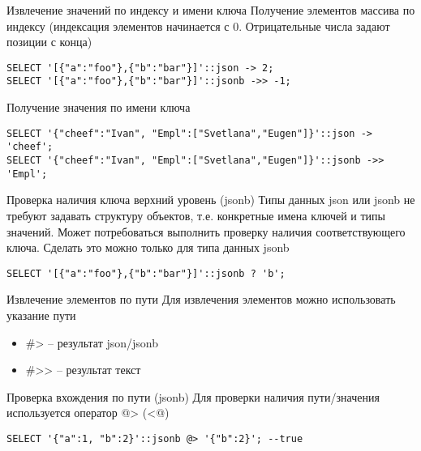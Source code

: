\documentclass[12pt]{article}
\begin{document}
\begin{Example}{Извлечение значений по индексу и имени ключа}
    Получение элементов массива по индексу (индексация элементов начинается с 0. Отрицательные числа задают позиции с конца)

\begin{lstlisting}
SELECT '[{"a":"foo"},{"b":"bar"}]'::json -> 2;
SELECT '[{"a":"foo"},{"b":"bar"}]'::jsonb ->> -1;
\end{lstlisting}

    Получение значения по имени ключа 

\begin{lstlisting}
SELECT '{"cheef":"Ivan", "Empl":["Svetlana","Eugen"]}'::json -> 'cheef';
SELECT '{"cheef":"Ivan", "Empl":["Svetlana","Eugen"]}'::jsonb ->> 'Empl';
\end{lstlisting}
\end{Example}

\begin{Example}{Проверка наличия ключа верхний уровень (jsonb)}
    Типы данных json или jsonb не требуют задавать структуру объектов, т.е. конкретные имена ключей и типы значений. Может потребоваться выполнить проверку наличия соответствующего ключа. Сделать это можно только для типа данных jsonb

\begin{lstlisting}
SELECT '[{"a":"foo"},{"b":"bar"}]'::jsonb ? 'b';
\end{lstlisting}
\end{Example}

\begin{Example}{Извлечение элементов по пути}
    Для извлечения элементов можно использовать указание пути 

    \begin{itemize}
        \item \#> -- результат json/jsonb 
        \item \#>> -- результат текст
    \end{itemize}
\end{Example}

\begin{Example}{Проверка вхождения по пути (jsonb)}
    Для проверки наличия пути/значения используется оператор @> (<@)

\begin{lstlisting}
SELECT '{"a":1, "b":2}'::jsonb @> '{"b":2}'; --true
\end{lstlisting}
\end{Example}
\end{document}
